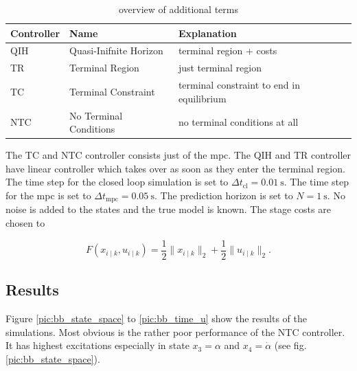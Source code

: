 \documentclass[10pt,a4paper]{article}
\begin{document}
\renewcommand{\arraystretch}{1.25}
\begin{table}[ht]
    \centering
    \captionsetup{skip=0.25cm}
    \caption{overview of additional terms}
    \label{tbl:controler}
    \begin{tabular}{|p{2cm}|p{4cm}|p{5.5cm}|}
        \hline
        \textbf{Controller} & \textbf{Name} &  \textbf{Explanation}\\
        \hline
        QIH & Quasi-Inifnite Horizon & terminal region + costs\\
        \hline
        TR & Terminal Region & just terminal region\\
        \hline
        TC & Terminal Constraint & terminal constraint to end in equilibrium\\
        \hline
        NTC & No Terminal Conditions & no terminal conditions at all\\
        \hline
    \end{tabular}
\end{table}

The TC and NTC controller consists just of the \gls{mpc}. The QIH and TR controller have linear controller which takes over as soon as they enter the terminal region.
The time step for the closed loop simulation is set to $\Delta t_{\text{cl}} = \SI{0.01}{\second}$.  The time step for the \gls{mpc} is set to
$\Delta t_{\text{mpc}} = \SI{0.05}{\second}$. The prediction horizon is set to $N = \SI{1}{\second}$. No noise is added to the states and the true
model is known. The stage costs are chosen to

\begin{equation}
	F\left(x_{i \mid k}, u_{i \mid k}\right) = \frac{1}{2} \lVert x_{i \mid k} \rVert_2 + \frac{1}{2} \lVert u_{i \mid k} \rVert_2.
\end{equation}



\subsection{Results}
Figure \ref{pic:bb_state_space} to \ref{pic:bb_time_u} show the results of the simulations. Most obvious is the rather poor performance of the NTC controller.
It has highest excitations especially in state $x_3 = \alpha$ and $x_4 = \dot{\alpha}$ (see fig. \ref{pic:bb_state_space}).
\end{document}
